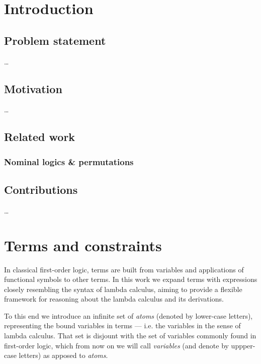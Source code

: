 \documentclass[english, mgr]{iithesis}
\author         {Dominik Gulczyński}
\date           {\today}                     %
\begin{document}
\chapter{Introduction}

\section{Problem statement}
\dots

\section{Motivation}
\dots

\section{Related work}
\subsection{Nominal logics \& permutations}

\section{Contributions}
\dots

\chapter{Terms and constraints}

In classical first-order logic, terms are built from variables and
applications of functional symbols to other terms.
In this work we expand terms with expressions closely resembling the syntax
of lambda calculus, aiming to provide a flexible framework for reasoning about
the lambda calculus and its derivations.

To this end we introduce an infinite set of \textit{atoms}
(denoted by lower-case letters), representing the bound variables in terms
--- i.e. the variables in the sense of lambda calculus.
That set is disjount with the set of variables commonly found in first-order logic,
which from now on we will call \textit{variables} (and denote by uppper-case letters)
as apposed to \textit{atoms}.
\end{document}
